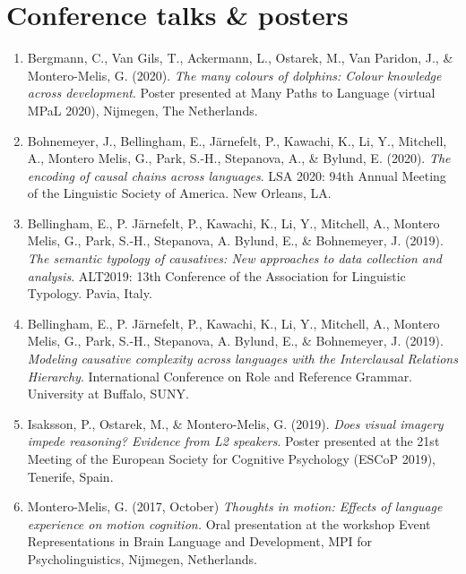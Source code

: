 \documentclass[margin, 11pt]{res} %
\begin{document}
\begin{resume}
\begin{enumerate}
\end{enumerate}


\section{\sc Conference talks \& posters}
\begin{enumerate}

\item Bergmann, C., Van Gils, T., Ackermann, L., Ostarek, M., Van Paridon, J., \& Montero-Melis, G. (2020). \emph{The many colours of dolphins: Colour knowledge across development}. Poster presented at Many Paths to Language (virtual MPaL 2020), Nijmegen, The Netherlands.

\item Bohnemeyer, J., Bellingham, E., J{\"a}rnefelt, P., Kawachi, K., Li, Y., Mitchell, A., Montero Melis, G., Park, S.-H., Stepanova, A., \& Bylund, E. (2020). \emph{The encoding of causal chains across languages}. LSA 2020: 94th Annual Meeting of the Linguistic Society of America. New Orleans, LA.

\item Bellingham, E., P. J{\"a}rnefelt, P., Kawachi, K., Li, Y., Mitchell, A., Montero Melis, G., Park, S.-H., Stepanova, A. Bylund, E., \& Bohnemeyer, J. (2019). \emph{The semantic typology of causatives: New approaches to data collection and analysis}. ALT2019: 13th Conference of the Association for Linguistic Typology. Pavia, Italy. 

\item Bellingham, E., P. J{\"a}rnefelt, P., Kawachi, K., Li, Y., Mitchell, A., Montero Melis, G., Park, S.-H., Stepanova, A. Bylund, E., \& Bohnemeyer, J. (2019). \emph{Modeling causative complexity across languages with the Interclausal Relations Hierarchy}. International Conference on Role and Reference Grammar. University at Buffalo, SUNY.

\item Isaksson, P., Ostarek, M., \& Montero-Melis, G. (2019). \emph{Does visual imagery impede reasoning? Evidence from L2 speakers}. Poster presented at the 21st Meeting of the European Society for Cognitive Psychology (ESCoP 2019), Tenerife, Spain.

\item Montero-Melis, G. (2017, October) \emph{Thoughts in motion: Effects of language experience on motion cognition.} Oral presentation at the workshop Event Representations in Brain Language and Development, MPI for Psycholinguistics, Nijmegen, Netherlands.


\end{enumerate}
\end{resume}
\end{document}

